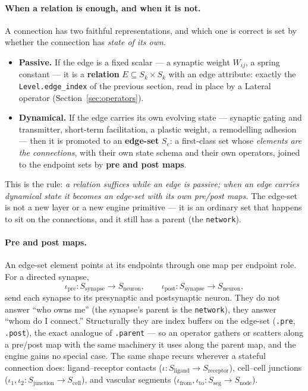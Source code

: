 \documentclass[11pt]{article}
\newcommand{\code}[1]{\texttt{#1}}
\begin{document}
\paragraph{When a relation is enough, and when it is not.} A connection has two
faithful representations, and which one is correct is set by whether the connection
has \emph{state of its own}.
\begin{itemize}\itemsep2pt
\item \textbf{Passive.} If the edge is a fixed scalar --- a synaptic weight
$W_{ij}$, a spring constant --- it is a \textbf{relation} $E\subseteq S_k\times S_k$
with an edge attribute: exactly the \code{Level.edge\_index} of the previous
section, read in place by a Lateral operator (Section~\ref{sec:operators}).
\item \textbf{Dynamical.} If the edge carries its own evolving state --- synaptic
gating and transmitter, short-term facilitation, a plastic weight, a remodelling
adhesion --- then it is promoted to an \textbf{edge-set} $S_e$: a first-class set
whose \emph{elements are the connections}, with their own state schema and their own
operators, joined to the endpoint sets by \textbf{pre and post maps}.
\end{itemize}
This is the rule: \emph{a relation suffices while an edge is passive; when an edge
carries dynamical state it becomes an edge-set with its own pre/post maps.} The
edge-set is not a new layer or a new engine primitive --- it is an ordinary set that
happens to sit on the connections, and it still has a parent (the \code{network}).

\paragraph{Pre and post maps.} An edge-set element points at its endpoints through
one map per endpoint role. For a directed synapse,
\[
  \iota_{\mathrm{pre}}:S_{\mathrm{synapse}}\to S_{\mathrm{neuron}},
  \qquad
  \iota_{\mathrm{post}}:S_{\mathrm{synapse}}\to S_{\mathrm{neuron}},
\]
send each synapse to its presynaptic and postsynaptic neuron. They do not answer
``who owns me'' (the synapse's parent is the \code{network}), they answer ``whom do I
connect.'' Structurally they are index buffers on the edge-set (\code{.pre},
\code{.post}), the exact analogue of \code{.parent} --- so an operator gathers or
scatters along a pre/post map with the same machinery it uses along the parent map,
and the engine gains no special case. The same shape recurs wherever a stateful
connection does: ligand--receptor contacts
($\iota:S_{\mathrm{ligand}}\to S_{\mathrm{receptor}}$), cell--cell junctions
($\iota_1,\iota_2:S_{\mathrm{junction}}\to S_{\mathrm{cell}}$), and vascular segments
($\iota_{\mathrm{from}},\iota_{\mathrm{to}}:S_{\mathrm{seg}}\to S_{\mathrm{node}}$).
\end{document}
